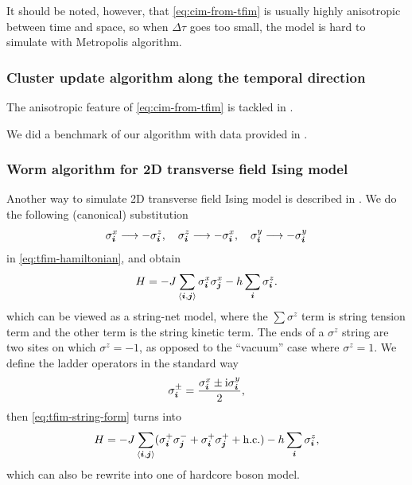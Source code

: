 \documentclass[hyperref, a4paper]{article}
\newcommand*{\ii}{\mathrm{i}}
\newcommand*{\pair}[1]{\langle #1 \rangle}
\newcommand*{\tfim}{transverse field Ising model}
\begin{document}

It should be noted, however, that \eqref{eq:cim-from-tfim} is usually highly anisotropic between time and space, so when $\Delta \tau$ goes too small, the model is hard to simulate with Metropolis algorithm.

\subsubsection{Cluster update algorithm along the temporal direction}

The anisotropic feature of \eqref{eq:cim-from-tfim} is tackled in \cite{Blte2002}.

We did a benchmark of our algorithm with data provided in \cite{Friedman_1978}.

\subsubsection{Worm algorithm for 2D \tfim{}}

Another way to simulate 2D \tfim{} is described in \cite{Huang_2020}.
We do the following (canonical) substitution
\begin{equation}
    \sigma_{\vb*{i}}^x \longrightarrow - \sigma^z_{\vb*{i}}, \quad \sigma_{\vb*{i}}^z \longrightarrow - \sigma^x_{\vb*{i}}, \quad \sigma^y_{\vb*{i}} \longrightarrow - \sigma^y_{\vb*{i}}
\end{equation}
in \eqref{eq:tfim-hamiltonian}, and obtain
\begin{equation}
    H = - J \sum_{\pair{\vb*{i}, \vb*{j}}} \sigma^x_{\vb*{i}} \sigma^x_{\vb*{j}} - h \sum_{\vb*{i}} \sigma^z_{\vb*{i}}.
    \label{eq:tfim-string-form}
\end{equation}
which can be viewed as a string-net model, where the $\sum \sigma^z$ term is string tension term and the other term is the string kinetic term.
The ends of a $\sigma^z$ string are two sites on which $\sigma^z = -1$, as opposed to the ``vacuum'' case where $\sigma^z = 1$.
We define the ladder operators in the standard way
\begin{equation}
    \sigma^\pm_{\vb*{i}} = \frac{\sigma^x_{\vb*{i}} \pm \ii \sigma^y_{\vb*{i}}}{2},
\end{equation}
then \eqref{eq:tfim-string-form} turns into
\begin{equation}
    H = - J \sum_{\pair{\vb*{i}, \vb*{j}}} (\sigma^+_{\vb*{i}} \sigma^-_{\vb*{j}} + \sigma^+_{\vb*{i}} \sigma^+_{\vb*{j}} + \text{h.c.}) - h \sum_{\vb*{i}} \sigma_{\vb*{i}}^z,
    \label{eq:tfim-string-fragments}
\end{equation}
which can also be rewrite into one of hardcore boson model.
\end{document}
